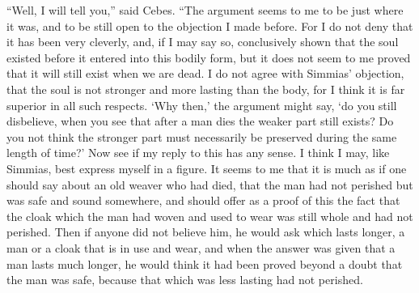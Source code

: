 \documentclass[letterpaper,12pt]{article}
\newcommand{\stephpag}[1]{\marginnote{\small\itshape\fontfamily{ppl}\selectfont #1}}
\begin{document}
\begin{drama}
``Well, I will tell you,'' said Cebes. ``The argument seems to me to be just where it was, and to be still open to the objection I made before. \stephpag{87 a} For I do not deny that it has been very cleverly, and, if I may say so, conclusively shown that the soul existed before it entered into this bodily form, but it does not seem to me proved that it will still exist when we are dead. I do not agree with Simmias' objection, that the soul is not stronger and more lasting than the body, for I think it is far superior in all such respects. `Why then,' the argument might say, `do you still disbelieve, when you see that after a man dies \stephpag{b} the weaker part still exists? Do you not think the stronger part must necessarily be preserved during the same length of time?' Now see if my reply to this has any sense. I think I may, like Simmias, best express myself in a figure. It seems to me that it is much as if one should say about an old weaver who had died, that the man had not perished but was safe and sound somewhere, and should offer as a proof of this the fact that the cloak which the man had woven and used to wear was still whole and had not perished. Then if anyone did not believe him, he would ask \stephpag{c} which lasts longer, a man or a cloak that is in use and wear, and when the answer was given that a man lasts much longer, he would think it had been proved beyond a doubt that the man was safe, because that which was less lasting had not perished.
 

\end{drama}
\end{document}
